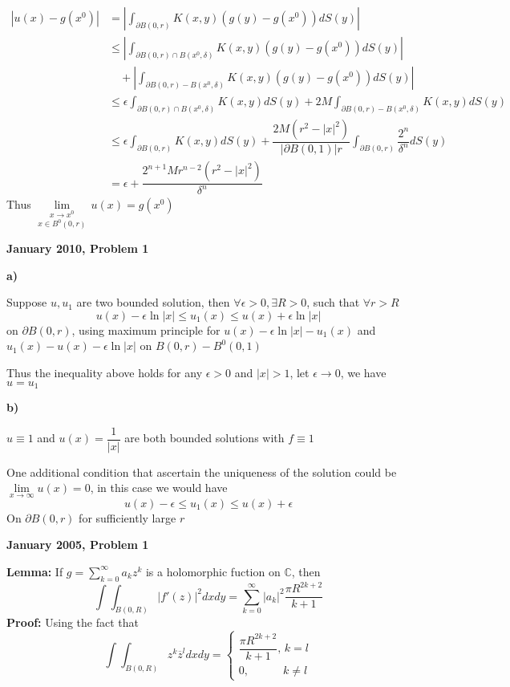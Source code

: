 \documentclass[12pt]{article}
\begin{document}
\[
\begin{aligned}
\left|u(x)-g(x^{0})\right|
&=\left|\int_{\partial B(0,r)}K(x,y)\left(g(y)-g(x^{0})\right)dS(y)\right| \\
&\leq \left|\int_{\partial B(0,r)\cap B(x^{0},\delta)}K(x,y)\left(g(y)-g(x^{0})\right)dS(y)\right| \\
&\quad + \left|\int_{\partial B(0,r)- B(x^{0},\delta)}K(x,y)\left(g(y)-g(x^{0})\right)dS(y)\right| \\
&\leq \epsilon\int_{\partial B(0,r)\cap B(x^{0},\delta)}K(x,y)dS(y) + 2M\int_{\partial B(0,r)- B(x^{0},\delta)}K(x,y)dS(y) \\
&\leq \epsilon\int_{\partial B(0,r)}K(x,y)dS(y) + \dfrac{2M\left(r^{2}-|x|^{2}\right)}{|\partial B(0,1)|r}\int_{\partial B(0,r)}\dfrac{2^{n}}{\delta^{n}} dS(y)  \\
&= \epsilon + \dfrac{2^{n+1}Mr^{n-2}\left(r^{2}-|x|^{2}\right)}{\delta^{n}}
\end{aligned}
\]Thus $\displaystyle{\underset{x\in B^{0}(0,r)}{\underset{x\rightarrow x^{0}}{\lim}}\,u(x)=g(x^{0})}$ \par
\textbf{January 2010, Problem 1} \par
\textbf{a)} \par
Suppose $u,u_{1}$ are two bounded solution, then $\forall \epsilon>0, \exists R>0$, such that $\forall r > R$
$$u(x)-\epsilon\ln|x| \leq u_{1}(x) \leq u(x)+\epsilon\ln|x|$$
on $\partial B(0,r)$, using maximum principle for $u(x)-\epsilon\ln|x|-u_{1}(x)$ and $u_{1}(x)-u(x)-\epsilon\ln|x|$ on $B(0,r)-B^{0}(0,1)$ \par
Thus the inequality above holds for any $\epsilon>0$ and $|x|>1$, let $\epsilon\rightarrow 0$, we have $u=u_{1}$ \par
\textbf{b)} \par
$u\equiv 1$ and $u(x)=\dfrac{1}{|x|}$ are both bounded solutions with $f\equiv 1$ \par
One additional condition that ascertain the uniqueness of the solution could be $\underset{x\rightarrow \infty}{\lim} u(x) = 0$, in this case we would have $$u(x)-\epsilon \leq u_{1}(x) \leq u(x)+\epsilon$$ On $\partial B(0,r)$ for sufficiently large $r$ \par
\textbf{January 2005, Problem 1} \par
\textbf{Lemma:} If $\displaystyle{g=\sum_{k=0}^{\infty}a_{k}z^{k}}$ is a holomorphic fuction on $\mathbb{C}$, then
\[
\int\int_{B(0,R)}|f'(z)|^{2}dxdy=\sum_{k=0}^{\infty}|a_{k}|^{2}\dfrac{\pi R^{2k+2}}{k+1}
\]
\textbf{Proof:} Using the fact that $$\int\int_{B(0,R)}z^{k}\overline{z}^{l}dxdy=
\left\{\begin{matrix}
\dfrac{\pi R^{2k+2}}{k+1}, \,k=l \\ 
0, \qquad\quad k\neq l
\end{matrix}\right.
$$
\end{document}
